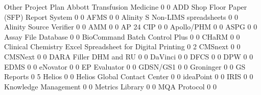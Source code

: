 \documentclass{article}
\begin{document}
\begin{Schunk}
\begin{Soutput}
                                                            Other Project Plan
  Abbott Transfusion Medicine                                   0            0
  ADD Shop Floor Paper (SFP) Report System                      0            0
  AFMS                                                          0            0
  Alinity S Non-LIMS spreadsheets                               0            0
  Alinity Source Verifier                                       0            0
  AMM                                                           0            0
  AP 24 CIP                                                     0            0
  Apollo/PHM                                                    0            0
  ASPG                                                          0            0
  Assay File Database                                           0            0
  BioCommand Batch Control Plus                                 0            0
  CHaRM                                                         0            0
  Clinical Chemistry Excel Spreadsheet for Digital Printing     0            2
  CMSnext                                                       0            0
  CMSNext                                                       0            0
  DARA Filler DHM and RU                                        0            0
  DaVinci                                                       0            0
  DFCS                                                          0            0
  DPW                                                           0            0
  EDMS                                                          0            0
  eNovator                                                      0            0
  EP Evaluator                                                  0            0
  GDSN/GS1                                                      0            0
  Groninger                                                     0            0
  GS Reports                                                    0            5
  Helios                                                        0            0
  Helios Global Contact Center                                  0            0
  ideaPoint                                                     0            0
  IRIS                                                          0            0
  Knowledge Management                                          0            0
  Metrics Library                                               0            0
  MQA Protocol                                                  0            0

\end{Soutput}
\end{Schunk}
\end{document}
